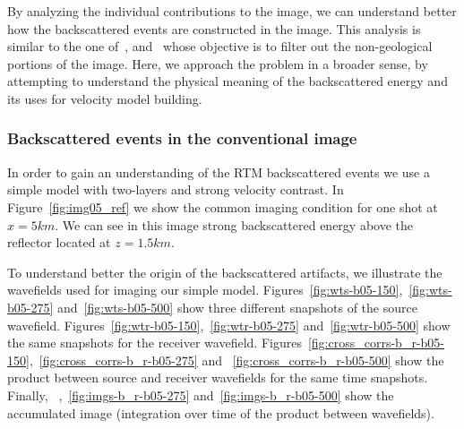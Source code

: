 By analyzing the individual contributions to the image, we can understand better how the backscattered events
are constructed in the image. This analysis is similar to the one of~\cite{fei:3130}, and~\cite{liu:S29}
whose objective is to filter out the non-geological portions of the image. Here, we approach the problem 
in a broader sense, by attempting to understand the physical meaning of the backscattered energy and its
uses for velocity model building.


\subsubsection{Backscattered events in the conventional image}

In order to gain an understanding of the RTM backscattered events we use a simple model with two-layers and strong velocity
contrast. In Figure~\ref{fig:img05_ref} we show the common imaging condition for one shot at $x=5km$. We can see in this image strong 
backscattered energy above the reflector located at $z=1.5km$.

To understand better the origin of the backscattered artifacts, we illustrate the wavefields used for imaging our simple model.
 Figures~\ref{fig:wts-b05-150},~\ref{fig:wts-b05-275} and~\ref{fig:wts-b05-500} show three different snapshots
of the source wavefield. Figures~\ref{fig:wtr-b05-150},~\ref{fig:wtr-b05-275} and~\ref{fig:wtr-b05-500}
show the same snapshots for the receiver wavefield. Figures~\ref{fig:cross_corrs-b_r-b05-150},~\ref{fig:cross_corrs-b_r-b05-275} and
~\ref{fig:cross_corrs-b_r-b05-500} show the product between source and receiver wavefields for the same time snapshots. Finally,
~,~\ref{fig:imgs-b_r-b05-275} and~\ref{fig:imgs-b_r-b05-500} show the accumulated image (integration over time of 
the product between wavefields).

